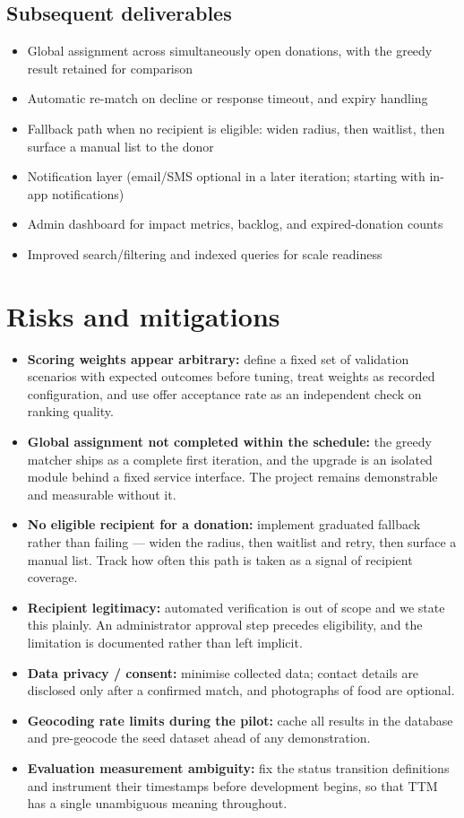 \documentclass[11pt,a4paper]{article}
\begin{document}
\subsection{Subsequent deliverables}
\begin{itemize}[leftmargin=0.7cm]
    \item Global assignment across simultaneously open donations, with the greedy result retained for comparison
    \item Automatic re-match on decline or response timeout, and expiry handling
    \item Fallback path when no recipient is eligible: widen radius, then waitlist, then surface a manual list to the donor
    \item Notification layer (email/SMS optional in a later iteration; starting with in-app notifications)
    \item Admin dashboard for impact metrics, backlog, and expired-donation counts
    \item Improved search/filtering and indexed queries for scale readiness
\end{itemize}

\section{Risks and mitigations}
\begin{itemize}[leftmargin=0.7cm]
    \item \textbf{Scoring weights appear arbitrary:} define a fixed set of validation scenarios with expected outcomes before tuning, treat weights as recorded configuration, and use offer acceptance rate as an independent check on ranking quality.
    \item \textbf{Global assignment not completed within the schedule:} the greedy matcher ships as a complete first iteration, and the upgrade is an isolated module behind a fixed service interface. The project remains demonstrable and measurable without it.
    \item \textbf{No eligible recipient for a donation:} implement graduated fallback rather than failing --- widen the radius, then waitlist and retry, then surface a manual list. Track how often this path is taken as a signal of recipient coverage.
    \item \textbf{Recipient legitimacy:} automated verification is out of scope and we state this plainly. An administrator approval step precedes eligibility, and the limitation is documented rather than left implicit.
    \item \textbf{Data privacy / consent:} minimise collected data; contact details are disclosed only after a confirmed match, and photographs of food are optional.
    \item \textbf{Geocoding rate limits during the pilot:} cache all results in the database and pre-geocode the seed dataset ahead of any demonstration.
    \item \textbf{Evaluation measurement ambiguity:} fix the status transition definitions and instrument their timestamps before development begins, so that TTM has a single unambiguous meaning throughout.
\end{itemize}
\end{document}

